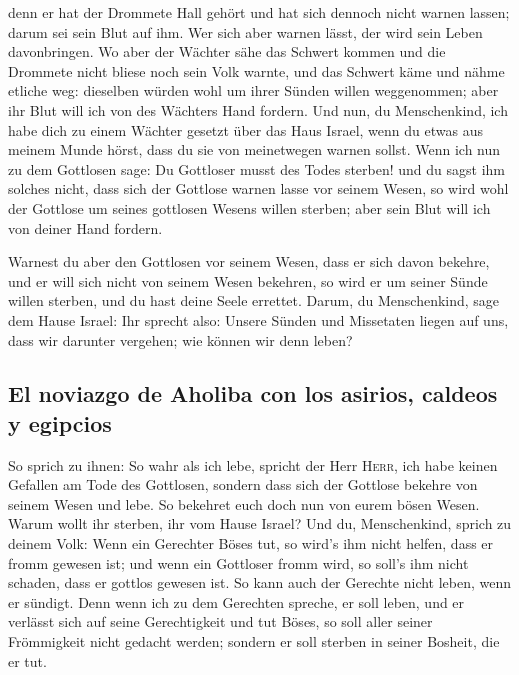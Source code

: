  denn er hat der Drommete Hall gehört und hat sich dennoch
nicht warnen lassen; darum sei sein Blut auf ihm. Wer sich aber warnen
lässt, der wird sein Leben davonbringen.  Wo aber der
Wächter sähe das Schwert kommen und die Drommete nicht bliese noch sein
Volk warnte, und das Schwert käme und nähme etliche weg: dieselben
würden wohl um ihrer Sünden willen weggenommen; aber ihr Blut will ich
von des Wächters Hand fordern.  Und nun, du Menschenkind,
ich habe dich zu einem Wächter gesetzt über das Haus Israel, wenn du
etwas aus meinem Munde hörst, dass du sie von meinetwegen warnen sollst.
 Wenn ich nun zu dem Gottlosen sage: Du Gottloser musst
des Todes sterben! und du sagst ihm solches nicht, dass sich der
Gottlose warnen lasse vor seinem Wesen, so wird wohl der Gottlose um
seines gottlosen Wesens willen sterben; aber sein Blut will ich von
deiner Hand fordern.

 Warnest du aber den Gottlosen vor seinem Wesen, dass er
sich davon bekehre, und er will sich nicht von seinem Wesen bekehren, so
wird er um seiner Sünde willen sterben, und du hast deine Seele
errettet.  Darum, du Menschenkind, sage dem Hause Israel:
Ihr sprecht also: Unsere Sünden und Missetaten liegen auf uns, dass wir
darunter vergehen; wie können wir denn leben?

\hypertarget{el-noviazgo-de-aholiba-con-los-asirios-caldeos-y-egipcios}{%
\subsection{El noviazgo de Aholiba con los asirios, caldeos y
egipcios}\label{el-noviazgo-de-aholiba-con-los-asirios-caldeos-y-egipcios}}

 So sprich zu ihnen: So wahr als ich lebe, spricht der
Herr \textsc{Herr}, ich habe keinen Gefallen am Tode des Gottlosen,
sondern dass sich der Gottlose bekehre von seinem Wesen und lebe. So
bekehret euch doch nun von eurem bösen Wesen. Warum wollt ihr sterben,
ihr vom Hause Israel?  Und du, Menschenkind, sprich zu
deinem Volk: Wenn ein Gerechter Böses tut, so wird's ihm nicht helfen,
dass er fromm gewesen ist; und wenn ein Gottloser fromm wird, so soll's
ihm nicht schaden, dass er gottlos gewesen ist. So kann auch der
Gerechte nicht leben, wenn er sündigt.  Denn wenn ich zu
dem Gerechten spreche, er soll leben, und er verlässt sich auf seine
Gerechtigkeit und tut Böses, so soll aller seiner Frömmigkeit nicht
gedacht werden; sondern er soll sterben in seiner Bosheit, die er tut.

